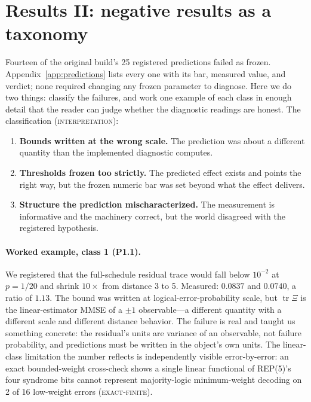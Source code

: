 \documentclass[11pt]{article}
\newcommand{\grade}[1]{\textsc{#1}}
\newcommand{\gExact}{\grade{exact-finite}}
\newcommand{\gInterp}{\grade{interpretation}}
\theoremstyle{definition}
\begin{document}
 \section{Results II: negative results as a taxonomy}
\label{sec:negatives}

Fourteen of the original build's 25 registered predictions failed as frozen. Appendix~\ref{app:predictions} lists every one with its bar, measured value, and verdict; none required changing any frozen parameter to diagnose. Here we do two things: classify the failures, and work one example of each class in enough detail that the reader can judge whether the diagnostic readings are honest. The classification (\gInterp): 

\begin{enumerate}
\item \textbf{Bounds written at the wrong scale.} The prediction was about a different quantity than the implemented diagnostic computes.
\item \textbf{Thresholds frozen too strictly.} The predicted effect exists and points the right way, but the frozen numeric bar was set beyond what the effect delivers.
\item \textbf{Structure the prediction mischaracterized.} The measurement is informative and the machinery correct, but the world disagreed with the registered hypothesis.
\end{enumerate}

\paragraph{Worked example, class 1 (P1.1).} We registered that the full-schedule residual trace would fall below $10^{-2}$ at $p = 1/20$ and shrink $10\times$ from distance 3 to 5. Measured: $0.0837$ and $0.0740$, a ratio of $1.13$. The bound was written at logical-error-probability scale, but $\operatorname{tr}\Xi$ is the linear-estimator MMSE of a $\pm1$ observable---a different quantity with a different scale and different distance behavior. The failure is real and taught us something concrete: the residual's units are variance of an observable, not failure probability, and predictions must be written in the object's own units. The linear-class limitation the number reflects is independently visible error-by-error: an exact bounded-weight cross-check shows a single linear functional of REP(5)'s four syndrome bits cannot represent majority-logic minimum-weight decoding on 2 of 16 low-weight errors (\gExact). 
\end{document}
